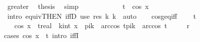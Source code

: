 \begin{isabellebody}
\ greater\ \isamarkupfalse%
\ {\isacharquery}{\kern0pt}thesis\ \isamarkupfalse%
\ simp\isanewline
\ \ \ \ \isamarkupfalse%
\isanewline
\ \ \ \ \isamarkupfalse%
\ \isamarkupfalse%
\ {\isachardoublequoteopen}t\ {\isacharless}{\kern0pt}\ cos\ x{\isachardoublequoteclose}\ \isamarkupfalse%
\ {\isacharparenleft}{\kern0pt}intro\ equiv{\isacharbrackleft}{\kern0pt}THEN\ iffD{}{\isacharbrackright}{\kern0pt}{\isacharparenright}{\kern0pt}\ {\isacharparenleft}{\kern0pt}use\ res\ k\ k{\isacharprime}{\kern0pt}\ \ auto{\isacharparenright}{\kern0pt}\isanewline
\ \ \isakeywordONE{{\isacharbraceright}{\kern0pt}}\isamarkupfalse%
\isanewline
{}\isamarkupfalse%
%
\endisatagproof
{\isafoldproof}%
%
\isadelimproof
\isanewline
%
\endisadelimproof
\isanewline
{}\isamarkupfalse%
\ cos{\isacharunderscore}{\kern0pt}geq{\isacharunderscore}{\kern0pt}iff{\isacharcolon}{\kern0pt}\ \isanewline
\ \ \ {\isachardoublequoteopen}t\ {\isasymin}\ {\isacharbraceleft}{\kern0pt}{\isacharminus}{\kern0pt}{}{\isachardot}{\kern0pt}{\isachardot}{\kern0pt}{}{\isacharbraceright}{\kern0pt}{\isachardoublequoteclose}\isanewline
\ \ \ {\isachardoublequoteopen}cos\ x\ {\isasymge}\ {\isacharparenleft}{\kern0pt}t{\isacharcolon}{\kern0pt}{\isacharcolon}{\kern0pt}real{\isacharparenright}{\kern0pt}\ {\isasymlongleftrightarrow}\ {\isacharparenleft}{\kern0pt}{\isasymexists}k{\isacharcolon}{\kern0pt}{\isacharcolon}{\kern0pt}int{\isachardot}{\kern0pt}\ x\ {\isasymin}\ {\isacharbraceleft}{\kern0pt}{}{\isacharasterisk}{\kern0pt}pi{\isacharasterisk}{\kern0pt}k\ {\isacharminus}{\kern0pt}\ arccos\ t{\isachardot}{\kern0pt}{\isachardot}{\kern0pt}{}{\isacharasterisk}{\kern0pt}pi{\isacharasterisk}{\kern0pt}k\ {\isacharplus}{\kern0pt}\ arccos\ t{\isacharbraceright}{\kern0pt}{\isacharparenright}{\kern0pt}{\isachardoublequoteclose}\isanewline
\ \ {\isacharparenleft}{\kern0pt}\ {\isachardoublequoteopen}{\isacharunderscore}{\kern0pt}\ {\isacharequal}{\kern0pt}\ {\isacharquery}{\kern0pt}r{\isachardoublequoteclose}{\isacharparenright}{\kern0pt}\isanewline
%
\isadelimproof
%
\endisadelimproof
%
\isatagproof
{}\isamarkupfalse%
{\isacharparenleft}{\kern0pt}cases\ {\isachardoublequoteopen}cos\ x\ {\isacharequal}{\kern0pt}\ t{\isachardoublequoteclose}{\isacharsemicolon}{\kern0pt}\ intro\ iffI{\isacharparenright}{\kern0pt}\isanewline

\end{isabellebody}
